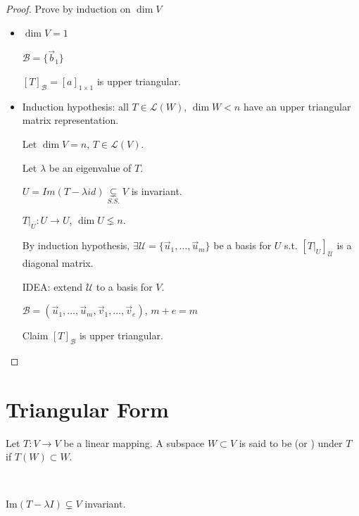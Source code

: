 \documentclass[11pt,fleqn]{book} %
\begin{document}
\begin{proof}
    Prove by induction on $\dim V$

    \begin{itemize}
        \item $\dim V = 1$

        $\mathcal{B} = \{ \vec{b}_1 \}$

        $[T]_\mathcal{B} = [a]_{1 \times 1}$ is upper triangular.

        \item Induction hypothesis: all $T \in \mathcal{L}(W)$, $\dim W < n$ have an upper triangular matrix representation.

        Let $\dim V = n$, $T \in \mathcal{L}(V)$.

        Let $\lambda$ be an eigenvalue of $T$.

        $U = Im(T - \lambda id) \underset{S.S.}{\subsetneq} V$ is invariant.

        $T\bigg|_{U}: U \to U$, $\dim U \lneq n$.

        By induction hypothesis, $\exists \mathcal{U} = \{ \vec{u}_1, \dots, \vec{u}_m \}$ be a basis for $U$ s.t. $[T\bigg|_U]_\mathcal{U}$ is a diagonal matrix.

        IDEA: extend $\mathcal{U}$ to a basis for $V$.

        $\mathcal{B} = (\vec{u}_1, \dots, \vec{u}_m, \vec{v}_1, \dots, \vec{v}_e)$, $m+e = m$

        Claim $[T]_\mathcal{B}$ is upper triangular.
    \end{itemize}
\end{proof}

\section{Triangular Form}

\setcounter{chapter}{6}
\setcounter{dummy}{1}
\begin{definition}[Invariant]
    Let $T: V \to V$ be a linear mapping. A subspace $W \subset V$ is said to be  (or ) under $T$ if $T(W) \subset W$.
\end{definition}
\setcounter{chapter}{4}

\begin{example}
{~~~}

    $\mathrm{Im}(T - \lambda I) \subsetneq V$ invariant.
\end{example}
\end{document}
